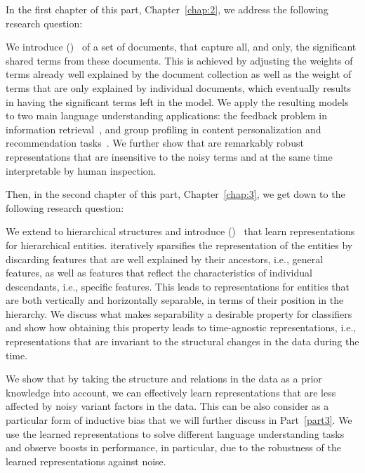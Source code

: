 In the first chapter of this part, Chapter~\ref{chap:2}, we address the following research question:

We introduce \emph{\swlms} (\acswlm)~\citep{Dehghani:2016:SIGIR} of a set of documents, that capture all, and only, the significant shared terms from these documents.  This is achieved by adjusting the weights of terms already well explained by the document collection as well as the weight of terms that are only explained by individual documents, which eventually results in having the significant terms left in the model. 
We apply the resulting models to two main language understanding applications: the feedback problem in information retrieval~\citep{Dehghani:CIKM2016:long, Dehghani:CIKM2016:short}, and group profiling in content personalization and recommendation tasks~\citep{Dehghani:2016:CHIIR,Dehghani2016:trec}. We further show that \acswlm are remarkably robust representations that are insensitive to the noisy terms and at the same time interpretable by human inspection. 

Then, in the second chapter of this part, Chapter~\ref{chap:3}, we get down to the following research question:

We extend \emph{\swlms} to hierarchical structures and introduce \emph{\hswlms} (\achswlm)~\citep{Dehghani:2016:ICTIR, Dehghani:2016:CLEF} that learn representations for hierarchical entities. \achswlm iteratively sparsifies the representation of the entities by discarding features that are well explained by their ancestors, i.e., general features, as well as features that reflect the characteristics of individual descendants, i.e., specific features. This leads to representations for entities that are both vertically and horizontally separable, in terms of their position in the hierarchy. We discuss what makes separability a desirable property for classifiers and show how obtaining this property leads to time-agnostic representations, i.e., representations that are invariant to the structural changes in the data during the time.

\medskip
We show that by taking the structure and relations in the data as a prior knowledge into account, we can effectively learn representations that are less affected by noisy variant factors in the data. This can be also consider as a particular form of inductive bias that we will further discuss in Part~\ref{part3}. 
We use the learned representations to solve different language understanding tasks and observe boosts in performance, in particular, due to the robustness of the learned representations against noise.



